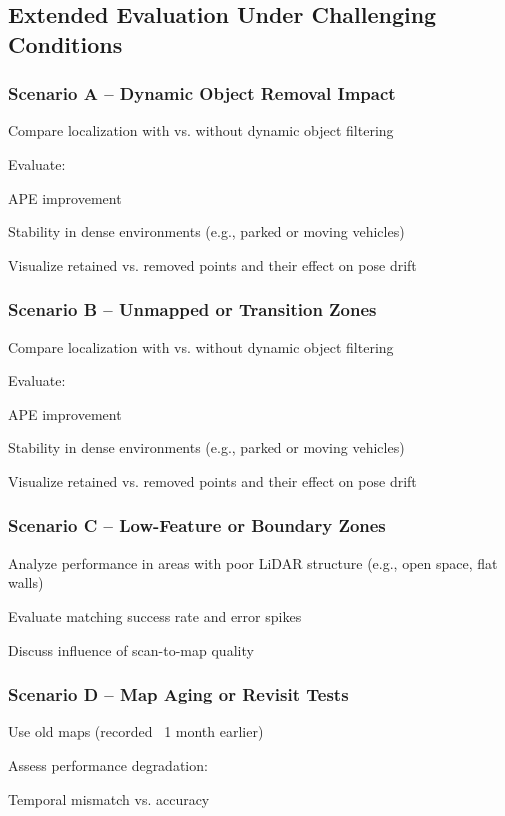\subsection{ Extended Evaluation Under Challenging Conditions}


\subsubsection{Scenario A – Dynamic Object Removal Impact}
Compare localization with vs. without dynamic object filtering

Evaluate:

APE improvement

Stability in dense environments (e.g., parked or moving vehicles)

Visualize retained vs. removed points and their effect on pose drift

\subsubsection{ Scenario B – Unmapped or Transition Zones}
Compare localization with vs. without dynamic object filtering

Evaluate:

APE improvement

Stability in dense environments (e.g., parked or moving vehicles)

Visualize retained vs. removed points and their effect on pose drift

\subsubsection{Scenario C – Low-Feature or Boundary Zones}

Analyze performance in areas with poor LiDAR structure (e.g., open space, flat walls)

Evaluate matching success rate and error spikes

Discuss influence of scan-to-map quality

\subsubsection{Scenario D – Map Aging or Revisit Tests}

    Use old maps (recorded ~1 month earlier)

Assess performance degradation:

Temporal mismatch vs. accuracy


